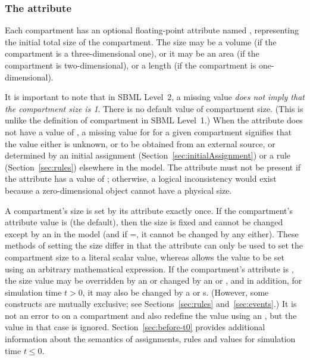 \subsubsection{The  attribute}
\label{sec:size}

Each compartment has an optional floating-point attribute named
, representing the initial total size of the
compartment.  The size may be a volume (if the compartment is a
three-dimensional one), or it may be an area (if the compartment
is two-dimensional), or a length (if the compartment is
one-dimensional).

It is important to note that in SBML Level~2, a missing
 value \emph{does not imply that the compartment size
  is 1}.  There is no default value of compartment size.  (This is
unlike the definition of compartment  in SBML
Level~1.)  When the  attribute does not have
a value of , a missing value for  for a given
compartment signifies that the value either is unknown, or to be
obtained from an external source, or determined by an initial
assignment (Section~\ref{sec:initialAssignment}) or a rule
(Section~\ref{sec:rules}) elsewhere in the model.  The
 attribute must not be present if the
 attribute has a value of ; otherwise,
a logical inconsistency would exist because a zero-dimensional
object cannot have a physical size.

A compartment's size is set by its 
attribute exactly once.  If the compartment's
 attribute value is  (the
default), then the size is fixed and cannot be changed except by
an \InitialAssignment in the model (and if
=, it cannot be changed by any
\InitialAssignment either).  These methods of setting the size
differ in that the  attribute can only be used to set
the compartment size to a literal scalar value, whereas
\InitialAssignment allows the value to be set using an arbitrary
mathematical expression.  If the compartment's 
attribute is , the size value may be overridden by an
\InitialAssignment or changed by an \AssignmentRule or
\AlgebraicRule, and in addition, for simulation time $t > 0$, it
may also be changed by a \RateRule or \Event{}s.  (However, some
constructs are mutually exclusive; see Sections~\ref{sec:rules}
and~\ref{sec:events}.)  It is not an error to 
on a compartment and also redefine the value using an
\InitialAssignment, but the   value in that case is
ignored.  Section~\ref{sec:before-t0} provides additional
information about the semantics of assignments, rules and values
for simulation time $t \leq 0$.

